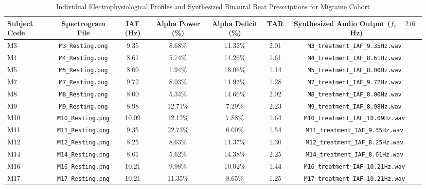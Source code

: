 \documentclass[12pt, a4paper]{report}
\begin{document}
\begin{table}[htbp]
\centering
\caption{Individual Electrophysiological Profiles and Synthesized Binaural Beat Prescriptions for Migraine Cohort}
\label{tab:migraine_prescriptions}
\begin{adjustbox}{width=0.98\textwidth}
\begin{tabular}{lcccccc}
\toprule
\textbf{Subject Code} & \textbf{Spectrogram File} & \textbf{IAF (Hz)} & \textbf{Alpha Power (\%)} & \textbf{Alpha Deficit (\%)} & \textbf{TAR} & \textbf{Synthesized Audio Output ($f_c = 216$~Hz)} \\
\midrule
M3 & \texttt{M3\_Resting.png} & 9.35 & 8.68\% & 11.32\% & 2.01 & \texttt{M3\_treatment\_IAF\_9.35Hz.wav} \\
M4 & \texttt{M4\_Resting.png} & 8.61 & 5.74\% & 14.26\% & 1.61 & \texttt{M4\_treatment\_IAF\_8.61Hz.wav} \\
M5 & \texttt{M5\_Resting.png} & 8.00 & 1.94\% & 18.06\% & 1.14 & \texttt{M5\_treatment\_IAF\_8.00Hz.wav} \\
M7 & \texttt{M7\_Resting.png} & 9.72 & 8.03\% & 11.97\% & 1.28 & \texttt{M7\_treatment\_IAF\_9.72Hz.wav} \\
M8 & \texttt{M8\_Resting.png} & 8.00 & 5.34\% & 14.66\% & 2.02 & \texttt{M8\_treatment\_IAF\_8.00Hz.wav} \\
M9 & \texttt{M9\_Resting.png} & 8.98 & 12.71\% & 7.29\% & 2.23 & \texttt{M9\_treatment\_IAF\_8.98Hz.wav} \\
M10 & \texttt{M10\_Resting.png} & 10.09 & 12.12\% & 7.88\% & 1.64 & \texttt{M10\_treatment\_IAF\_10.09Hz.wav} \\
M11 & \texttt{M11\_Resting.png} & 9.35 & 22.73\% & 0.00\% & 1.54 & \texttt{M11\_treatment\_IAF\_9.35Hz.wav} \\
M12 & \texttt{M12\_Resting.png} & 8.25 & 8.63\% & 11.37\% & 1.30 & \texttt{M12\_treatment\_IAF\_8.25Hz.wav} \\
M14 & \texttt{M14\_Resting.png} & 8.61 & 5.62\% & 14.38\% & 2.25 & \texttt{M14\_treatment\_IAF\_8.61Hz.wav} \\
M16 & \texttt{M16\_Resting.png} & 10.21 & 9.98\% & 10.02\% & 1.44 & \texttt{M16\_treatment\_IAF\_10.21Hz.wav} \\
M17 & \texttt{M17\_Resting.png} & 10.21 & 11.35\% & 8.65\% & 1.25 & \texttt{M17\_treatment\_IAF\_10.21Hz.wav} \\
\bottomrule
\end{tabular}
\end{adjustbox}
\end{table}
\end{document}
